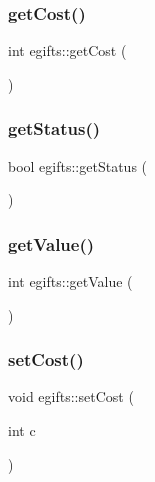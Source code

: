 \subsubsection{\texorpdfstring{get\+Cost()}{getCost()}}
{\footnotesize\ttfamily int egifts\+::get\+Cost (\begin{DoxyParamCaption}{ }\end{DoxyParamCaption})}

\mbox{\label{classinfo_1_1egifts_ad890793e5630b1f267aaf3e3ff78b0e3}} 
\subsubsection{\texorpdfstring{get\+Status()}{getStatus()}}
{\footnotesize\ttfamily bool egifts\+::get\+Status (\begin{DoxyParamCaption}{ }\end{DoxyParamCaption})}

\mbox{\label{classinfo_1_1egifts_a3e9a4718f08ee328a6792895b3617366}} 
\subsubsection{\texorpdfstring{get\+Value()}{getValue()}}
{\footnotesize\ttfamily int egifts\+::get\+Value (\begin{DoxyParamCaption}{ }\end{DoxyParamCaption})}

\mbox{\label{classinfo_1_1egifts_a516d5d969afa4815ee5cf54aa46e6ba7}} 
\subsubsection{\texorpdfstring{set\+Cost()}{setCost()}}
{\footnotesize\ttfamily void egifts\+::set\+Cost (\begin{DoxyParamCaption}\item[{int}]{c }\end{DoxyParamCaption})}

